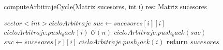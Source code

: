 \begin{algorithm}[H]
	\caption{computeArbitrajeCycle(Matriz sucesores, int i) res: Matriz sucesores}
	\begin{algorithmic}[1]
		\State $vector<int> cicloArbitraje$
		\State $suc \gets sucesores[i][i]$
		\State $cicloArbitraje.push_back(i)$
		 \Comment $\mathcal{O}(n)$
			\State $cicloArbitraje.push_back(suc)$
			\State $suc \gets sucesores[r][i]$
		\EndWhile
		\State $cicloArbitraje.push_back(i)$
		\State \textbf{return} $sucesores$
	\end{algorithmic}
\end{algorithm}